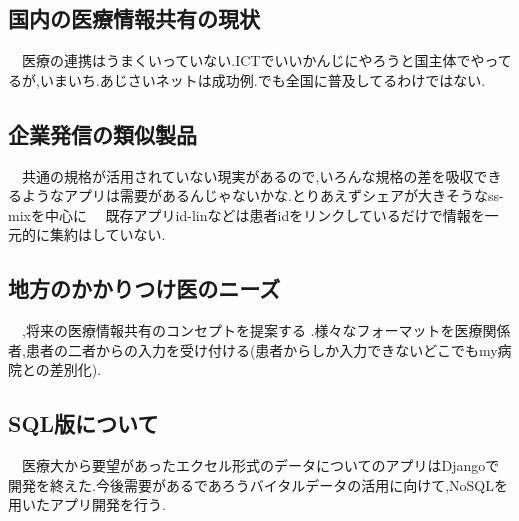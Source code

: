 \subsection{国内の医療情報共有の現状}
　医療の連携はうまくいっていない.ICTでいいかんじにやろうと国主体でやってるが,いまいち.あじさいネットは成功例.でも全国に普及してるわけではない.\cite{bibi3}

\subsection{企業発信の類似製品}
　共通の規格が活用されていない現実があるので,いろんな規格の差を吸収できるようなアプリは需要があるんじゃないかな.とりあえずシェアが大きそうなss-mixを中心に
　既存アプリid-linなどは患者idをリンクしているだけで情報を一元的に集約はしていない.

\subsection{地方のかかりつけ医のニーズ}
　,将来の医療情報共有のコンセプトを提案する .様々なフォーマットを医療関係者,患者の二者からの入力を受け付ける(患者からしか入力できないどこでもmy病院との差別化).

\subsection{SQL版について}
　医療大から要望があったエクセル形式のデータについてのアプリはDjangoで開発を終えた.今後需要があるであろうバイタルデータの活用に向けて,NoSQLを用いたアプリ開発を行う.

